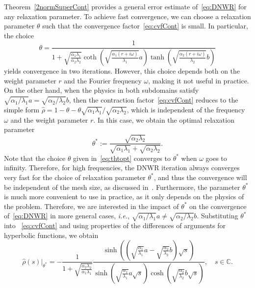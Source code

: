 \documentclass[reqno]{amsart}
\begin{document}
Theorem~\ref{2normSuperCont} provides a general error estimate of~\eqref{eq:DNWR} for any relaxation parameter. To achieve fast convergence, we can choose a relaxation parameter $\theta$ such that the convergence factor~\eqref{eq:cvfCont} is small. In particular, the choice
\begin{equation}\label{eq:thtopt}
\theta = \frac1{1 + \sqrt{\frac{\alpha_1 \lambda_1}{\alpha_2 \lambda_2}}\coth\left(\sqrt{\frac{\alpha_1 (r+i \omega)}{\lambda_1}} a\right) \tanh\left(\sqrt{\frac{\alpha_2 (r+i \omega)}{\lambda_2}} b\right)}
\end{equation}
yields convergence in two iterations. However, this choice depends both on the weight parameter $r$ and the Fourier frequency $\omega$, making it not useful in practice. On the other hand, when the physics in both subdomains satisfy $\sqrt{\alpha_1/\lambda_1} a = \sqrt{\alpha_2/\lambda_2} b$, then the contraction factor~\eqref{eq:cvfCont} reduces to the simple form $\hat{\rho} = 1 - \theta - \theta\sqrt{\alpha_1 \lambda_1}/\sqrt{\alpha_2 \lambda_2}$, which is independent of the frequency $\omega$ and the weight parameter $r$. In this case, we obtain the optimal relaxation parameter
\begin{equation}\label{eq:thetaopt}
	\theta^* := \frac{\sqrt{\alpha_2\lambda_2}}{\sqrt{\alpha_1\lambda_1}+\sqrt{\alpha_2\lambda_2}}.
\end{equation}
Note that the choice $\theta$ given in~\eqref{eq:thtopt} converges to $\theta^*$ when $\omega$ goes to infinity.
Therefore, for high frequencies, the DNWR iteration always converges very fast for the choice of relaxation parameter $\theta^*$, and thus the convergence will be independent of the mesh size, as discussed in~\cite[Chapter 4.7, p.174]{Ciaramella2022}. 
Furthermore, the parameter $\theta^*$ is much more convenient to use in practice, as it only depends on the physics of the problem. Therefore, we are interested in the impact of $\theta^*$ on the convergence of~\eqref{eq:DNWR} in more general cases, {\it i.e.}, $\sqrt{\alpha_1/\lambda_1} a \neq \sqrt{\alpha_2/\lambda_2} b$. Substituting $\theta^*$ into ~\eqref{eq:cvfCont} and using properties of the differences of arguments for hyperbolic functions, we obtain
\begin{equation}\label{eq:rhotheta}
\hat{\rho}(s)|_{\theta^*} = -\frac{1}{1+\sqrt{\frac{\alpha_2\lambda_2}{\alpha_1\lambda_1}}}\frac{\sinh\left(\left(\sqrt{\frac{\alpha_1}{\lambda_1}} a - \sqrt{\frac{\alpha_2}{\lambda_2}} b\right) \sqrt{s}\right)}{\sinh\left(\sqrt{\frac{\alpha_1}{\lambda_1}} a\sqrt{s}\right)\cosh\left(\sqrt{\frac{\alpha_2}{\lambda_2}} b\sqrt{s}\right)},
\quad 
s \in \mathbb{C}.
\end{equation}
\end{document}
